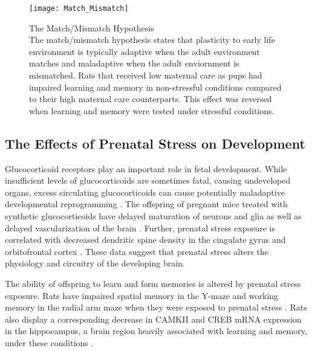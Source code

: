 \documentclass[12pt,twoside]{reedthesis}
\begin{document}
 \begin{figure}[htbp] 
\begin{centering} 
\texttt{[image: Match\_Mismatch]}
\caption[The Match/Mismatch Hypothesis]{\footnotesize{The Match/Mismatch
    Hypothesis \\ The match/mismatch hypothesis states that plasticity to early
    life environment is typically adaptive when the adult environment matches
    and maladaptive when the adult enviornment is mismatched. Rats
    that received low maternal care as pups had impaired learning and memory in
    non-stressful conditions compared to their high maternal care counterparts.
    This effect was reversed when learning and memory were tested under
    stressful conditions.}}
\label{subd}
\end{centering} 
\end{figure}

\subsection{The Effects of Prenatal Stress on Development}
Glucocorticoid receptors play an important role in fetal development. While
insufficient levels of glucocorticoids are sometimes fatal, causing undeveloped organs,
excess circulating glucocorticoids can cause potentially maladaptive developmental
reprogramming \citep{2017Nrid}. The offspring of pregnant mice treated with synthetic glucocorticoids
 have delayed maturation of neurons and glia as well as delayed vascularization
 of the brain \citep{gravanis_hormones_2011}. Further, prenatal stress exposure is correlated with
 decreased dendritic spine density in the cingulate gyrus and orbitofrontal
 cortex \citep{murmu_changes_2006}. These data suggest that prenatal stress alters the
 physiology and circuitry of the developing brain.

 The ability of offspring to learn and form memories is altered by prenatal
 stress exposure. Rats have impaired spatial memory in the Y-maze and
 working memory in the radial arm maze when they were exposed to prenatal stress
 \citep{vallee_long-term_1999}. Rats also display a corresponding
 decrease in CAMKII and CREB mRNA expression in the hippocampus, a brain region
 heavily associated with learning and memory, under these
 conditions \citep{sun_prenatal_2017}. 
\end{document}
